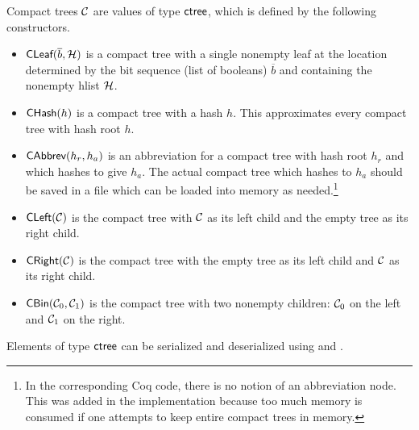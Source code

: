 Compact trees $\mathcal{C}$ are values of type ${\type{ctree}}$, which is defined by the following constructors.
\begin{itemize}
\item ${\constr{CLeaf}}(\overline{b},\cH)$ is a compact tree with a single nonempty leaf
at the location determined by the bit sequence (list of booleans) $\overline{b}$
and containing the nonempty hlist $\mathcal{H}$.
\item ${\constr{CHash}}(h)$ is a compact tree with a hash $h$. This approximates every compact tree with hash root $h$.
\item ${\constr{CAbbrev}}(h_r,h_a)$ is an abbreviation for a compact tree with hash root $h_r$
and which hashes to give $h_a$.
The actual compact tree which hashes to $h_a$
should be saved in a file which can be loaded into memory as needed.\footnote{In the corresponding Coq code, there is no notion of an abbreviation node. This was added in the implementation because too much memory is consumed if one attempts to keep entire compact trees in memory.}
\item ${\constr{CLeft}}(\cC)$ is the compact tree with $\mathcal{C}$ as its left child and the empty tree as its right child.
\item ${\constr{CRight}}(\cC)$ is the compact tree with the empty tree as its left child and $\mathcal{C}$ as its right child.
\item ${\constr{CBin}}(\cC_0,\cC_1)$ is the compact tree with two nonempty children: $\mathcal{C}_0$ on the left and $\mathcal{C}_1$ on the right.
\end{itemize}
Elements of type ${\type{ctree}}$ can be serialized and deserialized using
{}
and
{}.

